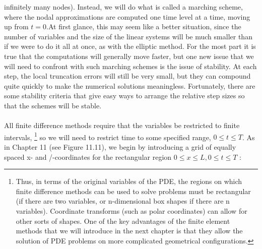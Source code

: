 \documentclass[../main.tex]{subfiles}
\begin{document}
infinitely many nodes). Instead, we will do what is called a marching scheme, 
where the nodal approximations are computed one time level at a time, moving up 
from $t = 0$.At first glance, this may seem like a better situation, since the number 
of variables and the size of the linear systems will be much smaller than if we 
were to do it all at once, as with the elliptic method. For the most part it is true 
that the computations will generally move faster, but one new issue that we will 
need to confront with such marching schemes is the issue of stability. At each 
step, the local truncation errors will still be very small, but they can compound 
quite quickly to make the numerical solutions meaningless. Fortunately, there are 
some stability criteria that give easy ways to arrange the relative step sizes so that 
the schemes will be stable.
\\
\\
All finite difference methods require that the variables be restricted to finite 
intervals,
\footnote{Thus, in terms of the original variables of the PDE, the regions on which finite difference methods 
can be used to solve problems must be rectangular (if there are two variables, or n-dimensional box 
shapes if there are n variables). Coordinate transforms (such as polar coordinates) can allow for other 
sorts of shapes. One of the key advantages of the finite element methods that we will introduce in the 
next chapter is that they allow the solution of PDE problems on more complicated geometrical 
configurations.}
so we will need to restrict time to some specified range, $0 \leqslant t\leqslant T$. As 
in Chapter 11 (see Figure 11.11), we begin by introducing a grid of equally spaced 
x- and /-coordinates for the rectangular region $0\leqslant x\leqslant L, 0\leqslant t \leqslant T$ :
\end{document}

